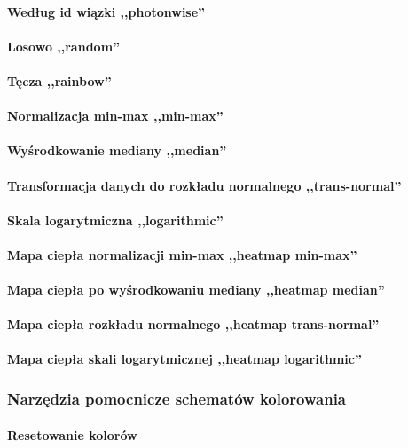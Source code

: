 \paragraph{Według id wiązki ,,photonwise''}
\paragraph{Losowo ,,random''}
\paragraph{Tęcza ,,rainbow''}
\paragraph{Normalizacja min-max ,,min-max''}
\paragraph{Wyśrodkowanie mediany ,,median''}
\paragraph{Transformacja danych do rozkładu normalnego ,,trans-normal''}
\paragraph{Skala logarytmiczna ,,logarithmic''}
\paragraph{Mapa ciepła normalizacji min-max ,,heatmap min-max''}
\paragraph{Mapa ciepła po wyśrodkowaniu mediany ,,heatmap median''}
\paragraph{Mapa ciepła rozkładu normalnego ,,heatmap trans-normal''}
\paragraph{Mapa ciepła skali logarytmicznej ,,heatmap logarithmic''}
\subsubsection{Narzędzia pomocnicze schematów kolorowania}
\paragraph{Resetowanie kolorów}
